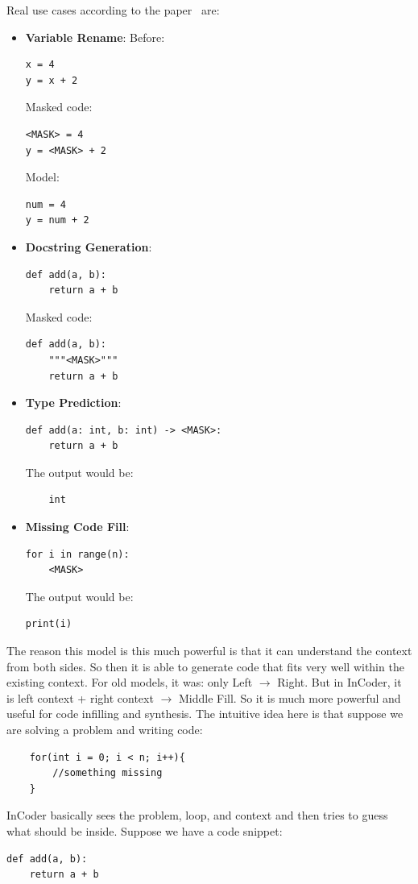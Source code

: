 \documentclass[12pt]{article}
\begin{document}
Real use cases according to the paper~\cite{fried2023incodergenerativemodelcode} are:
\begin{itemize}
	\item \textbf{Variable Rename}:
	Before:
	\begin{lstlisting}
x = 4
y = x + 2

	\end{lstlisting}
	Masked code:
	\begin{lstlisting}
<MASK> = 4
y = <MASK> + 2
	\end{lstlisting}
	Model:
	\begin{lstlisting}
num = 4
y = num + 2
	\end{lstlisting}
	\item \textbf{Docstring Generation}:
	\begin{lstlisting}
def add(a, b):
	return a + b
	\end{lstlisting}
	Masked code:
	\begin{lstlisting}
def add(a, b):
	"""<MASK>"""
	return a + b

	\end{lstlisting}
	\item \textbf{Type Prediction}:
	\begin{lstlisting}
def add(a: int, b: int) -> <MASK>:
	return a + b
	\end{lstlisting}
	The output would be:
	\begin{lstlisting}
	int
	\end{lstlisting}
	\item \textbf{Missing Code Fill}:
	\begin{lstlisting}
for i in range(n):
	<MASK>
	\end{lstlisting}
	The output would be:
	\begin{lstlisting}
print(i)
	\end{lstlisting}

\end{itemize}
The reason this model is this much powerful is that it can understand the context from both sides. So then it is able to generate code that fits very well within the existing context. For old models, it was:
only Left $\rightarrow$ Right.
But in InCoder, it is left context + right context $\rightarrow$ Middle Fill. So it is much more powerful and useful for code infilling and synthesis.
The intuitive idea here is that suppose we are solving a problem and writing code:
 \begin{lstlisting}
	for(int i = 0; i < n; i++){
		//something missing
	}
 \end{lstlisting}
InCoder basically sees the problem, loop, and context and then tries to guess what should be inside. 
Suppose we have a code snippet:
\begin{lstlisting}
def add(a, b):
	return a + b
\end{lstlisting}
\end{document}
